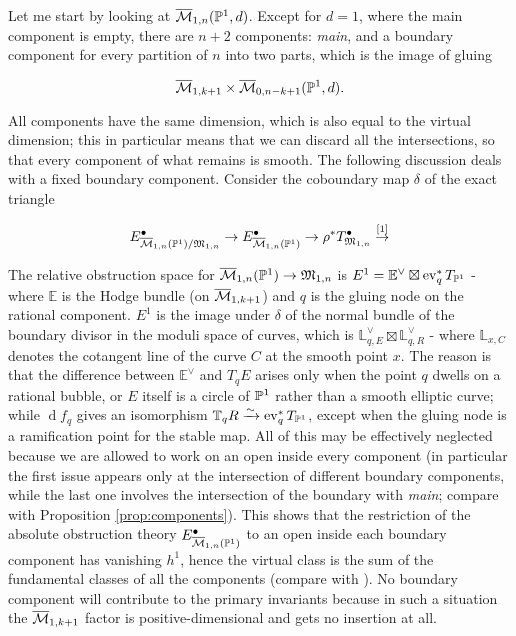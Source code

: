 Let me start by looking at $\overline{\mathcal{M}}_{1,n}(\mathbb P^1,d)$. Except for $d=1$, where the main component is empty, there are $n+2$ components: \emph{main}, and a boundary component for every partition of $n$ into two parts, which is the image of gluing

\[\overline{\mathcal{M}}_{1,k+1}\times\overline{\mathcal{M}}_{0,n-k+1}(\mathbb P^1,d).\]

All components have the same dimension, which is also equal to the virtual dimension; this in particular means that we can discard all the intersections, so that every component of what remains is smooth. The following discussion deals with a fixed boundary component. Consider the coboundary map $\delta$ of the exact triangle

\[ E^\bullet_{\overline{\mathcal{M}}_{1,n}(\mathbb P^1)/\mathfrak M_{1,n}}\rightarrow E^\bullet_{\overline{\mathcal{M}}_{1,n}(\mathbb P^1)}\rightarrow \rho^*T^\bullet_{\mathfrak M_{1,n}}\overset{[1]}{\rightarrow}\]

The relative obstruction space for $\overline{\mathcal{M}}_{1,n}(\mathbb P^1)\rightarrow \mathfrak M_{1,n}$ is $E^1=\mathbb E^\vee\boxtimes \operatorname{ev}_q^*T_{\mathbb P^1}$ - where $\mathbb E$ is the Hodge bundle (on $\overline{\mathcal{M}}_{1,k+1}$) and $q$ is the gluing node on the rational component. $E^1$ is the image under $\delta$ of the normal bundle of the boundary divisor in the moduli space of curves, which is $\mathbb L_{q,E}^\vee\boxtimes \mathbb L_{q,R}^\vee$ - where $\mathbb L_{x,C}$ denotes the cotangent line of the curve $C$ at the smooth point $x$. The reason is that the difference between $\mathbb E^\vee$ and $T_qE$ arises only when the point $q$ dwells on a rational bubble, or $E$ itself is a circle of $\mathbb P^1$ rather than a smooth elliptic curve; while $\operatorname{d}\!f_q$ gives an isomorphism $\mathbb T_qR\xrightarrow{\sim}\operatorname{ev}_q^*T_{\mathbb P^1}$, except when the gluing node is a ramification point for the stable map. All of this may be effectively neglected because we are allowed to work on an open inside every component (in particular the first issue appears only at the intersection of different boundary components, while the last one involves the intersection of the boundary with \emph{main}; compare with Proposition \ref{prop:components}). This shows that the restriction of the absolute obstruction theory $E^\bullet_{\overline{\mathcal{M}}_{1,n}(\mathbb P^1)}$ to an open inside each boundary component has vanishing $h^1$, hence the virtual class is the sum of the fundamental classes of all the components (compare with \cite[Proposition 5.5]{BF}). No boundary component will contribute to the primary invariants because in such a situation the $\overline{\mathcal{M}}_{1,k+1}$ factor is positive-dimensional and gets no insertion at all.

